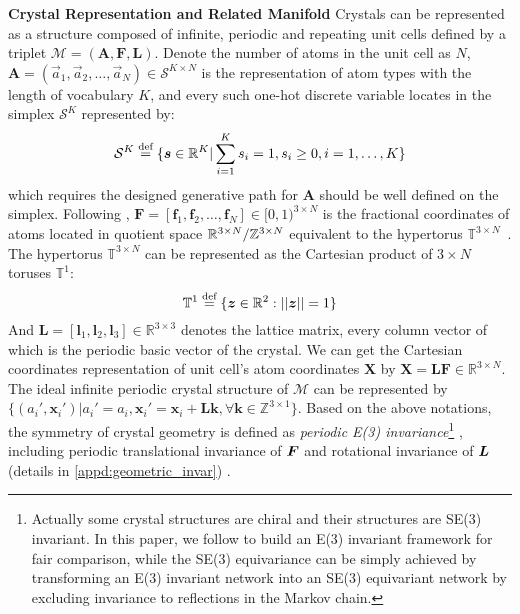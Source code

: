 \textbf{Crystal Representation and Related Manifold} Crystals can be represented as a structure composed of infinite, periodic and repeating unit cells defined by a triplet $\mathcal{M}=(\boldsymbol{A},\boldsymbol{F},\boldsymbol{L})$. Denote the number of atoms in the unit cell as $N$, $\boldsymbol{A}=(\vec{a}_1,\vec{a}_2,\dots,\vec{a}_N)\in \mathcal{S}^{K\times N}$ is the representation of atom types with the length of vocabulary $K$, and every such one-hot discrete variable locates in the simplex $\mathcal{S}^K$ represented by:
\begin{equation}
\mathcal{S}^K\stackrel{\text{def}}{=}\{\boldsymbol{s}\in \mathbb{R}^K|\sum_{i=1}^{K}s_i=1,s_i\geq0, i=1,\dots,K\}
\end{equation} 
which requires the designed generative path for $\boldsymbol{A}$ should be well defined on the simplex.
Following \citet{jiao2023crystal}, $\boldsymbol{F}=[\boldsymbol{f}_1,\boldsymbol{f}_2,\dots,\boldsymbol{f}_N]\in [0,1)^{3\times N}$ is the fractional coordinates of atoms located in quotient space $\mathbb{R}^{3\times N} / \mathbb{Z}^{3\times N}$ equivalent to the hypertorus $\mathbb{T}^{3\times N}$~\citep{jing2022torsional}. The hypertorus $\mathbb{T}^{3\times N}$ can be represented as the Cartesian product of  $3\times N$ toruses $\mathbb{T}^1$:
\begin{equation}
    \mathbb{T}^1\stackrel{\text{def}}{=} \{{\bm{z}}\in\mathbb{R}^2:||{\bm{z}}||=1\}
\end{equation}
And $\boldsymbol{L}=[\boldsymbol{l}_1,\boldsymbol{l}_2,\boldsymbol{l}_3]\in \mathbb{R}^{3\times 3}$ denotes the lattice matrix, every column vector of which is the periodic basic vector of the crystal. We can get the Cartesian coordinates representation of unit cell's atom coordinates $\bm{X}$ by $\boldsymbol{X}=\boldsymbol{L}\boldsymbol{F}\in \mathbb{R}^{3\times N}$. The ideal infinite periodic crystal structure of $\mathcal{M}$ can be represented by $\{(a_i',\boldsymbol{x}_i')|a_i'=a_i,\boldsymbol{x}_i'=\boldsymbol{x}_i+\boldsymbol{L}\boldsymbol{k},\forall\boldsymbol{k}\in \mathbb{Z}^{3\times 1}\}$. Based on the above notations, the symmetry of crystal geometry is defined as \emph{periodic E(3) invariance}\footnote{Actually some crystal structures are chiral \citep{flack2003chiral} and their structures are SE(3) invariant. In this paper, we follow \citet{jiao2023crystal} to build an E(3) invariant framework for fair comparison, while the SE(3) equivariance can be simply achieved by transforming an E(3) invariant network into an SE(3) equivariant network by excluding invariance to reflections in the Markov chain. } \citep{jiao2023crystal}, including periodic translational invariance of ${\bm{F}}$ and rotational invariance of ${\bm{L}}$ (details in \cref{appd:geometric_invar}) . 

